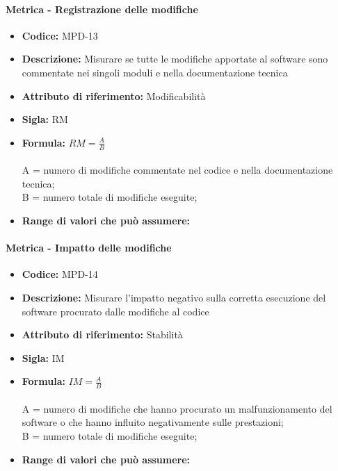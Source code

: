 \paragraph{Metrica - Registrazione delle modifiche} 
   \begin{itemize}
          \item  \textbf{Codice:} MPD-13
         \item   \textbf{Descrizione:} Misurare se tutte le modifiche apportate al software sono commentate nei singoli moduli e nella documentazione tecnica
         \item   \textbf{Attributo di riferimento:} Modificabilità
         \item   \textbf{Sigla:} RM
         \item   \textbf{Formula:} \begin{math}RM= \frac{A}{B}\end{math}\\ \\
            A = numero di modifiche commentate nel codice e nella documentazione tecnica;\\
            B = numero totale di modifiche eseguite;
       \item    \textbf{Range di valori che può assumere:}
           \end{itemize}
           
           \paragraph{Metrica - Impatto delle modifiche} 
              \begin{itemize}
         \item   \textbf{Codice:} MPD-14
          \item  \textbf{Descrizione:} Misurare l'impatto negativo sulla corretta esecuzione del software procurato dalle modifiche al codice
         \item   \textbf{Attributo di riferimento:} Stabilità
         \item   \textbf{Sigla:} IM
         \item   \textbf{Formula:} \begin{math}IM= \frac{A}{B}\end{math}\\ \\
            A = numero di modifiche che hanno procurato un malfunzionamento del software o che hanno influito negativamente sulle prestazioni;\\
            B = numero totale di modifiche eseguite;
          \item \textbf{Range di valori che può assumere:}
          \end{itemize}
           
